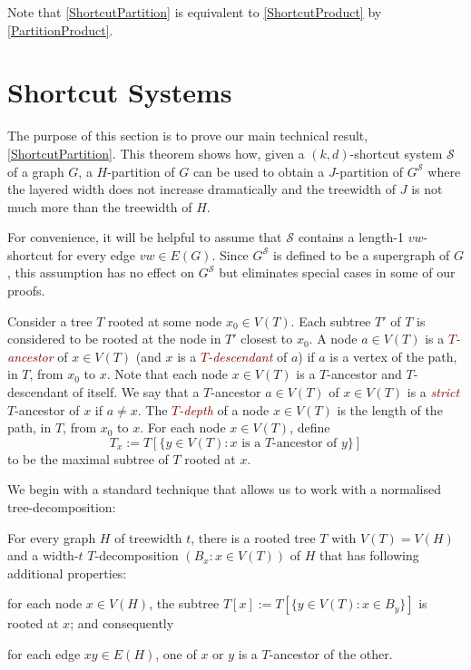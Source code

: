 \documentclass{patmorin}
\newcommand{\defin}[1]{\textcolor{Maroon}{\emph{#1}}}
\newcommand{\tlabel}[1]{\label{t:#1}}
\renewcommand{\SS}{\mathcal{S}}
\renewcommand{\le}{\leqslant}
\begin{document}
Note that \cref{ShortcutPartition} is equivalent to \cref{ShortcutProduct} by \cref{PartitionProduct}.



\section{Shortcut Systems}
\label{Structure}

The purpose of this section is to prove our main technical result, \cref{ShortcutPartition}. This theorem shows how, given a $(k,d)$-shortcut system $\SS$ of a graph $G$, a $H$-partition of $G$ can be used to obtain a $J$-partition of $G^{\SS}$ where the layered width  does not increase dramatically and the treewidth of $J$ is not much more than the treewidth of $H$.

For convenience, it will be helpful to assume that $\SS$ contains a length-1 $vw$-shortcut for every edge $vw\in E(G)$.  Since $G^\SS$ is defined to be a supergraph of $G$, this assumption has no effect on $G^{\SS}$ but eliminates special cases in some of our proofs.

Consider a tree $T$ rooted at some node $x_0\in V(T)$. Each subtree $T'$ of $T$ is considered to be rooted at the node in $T'$ closest to $x_0$. A node $a\in V(T)$ is a \defin{$T$-ancestor} of $x\in V(T)$ (and $x$ is a \defin{$T$-descendant} of $a$) if $a$ is a vertex of the path, in $T$, from $x_0$ to $x$.  Note that each node $x\in V(T)$ is a $T$-ancestor and $T$-descendant of itself.  We say that a $T$-ancestor $a\in V(T)$ of $x\in V(T)$ is a \defin{strict} $T$-ancestor of $x$ if $a\neq x$.
The \defin{$T$-depth} of a node $x\in V(T)$ is the length of the path, in $T$, from $x_0$ to $x$.  For each node $x\in V(T)$, define
\[T_x := T[\{y\in V(T):\mbox{$x$ is a $T$-ancestor of $y$}\}] \]
to be the maximal subtree of $T$ rooted at $x$.

We begin with a standard technique that allows us to work with a normalised tree-decomposition:

\begin{lem}
  For every graph $H$ of treewidth $t$, there is a rooted tree $T$ with $V(T)=V(H)$ and a width-$t$ $T$-decomposition $(B_x:x\in V(T))$ of $H$ that has following additional properties:
  \begin{compactenum}[(T1)]
    \item\tlabel{subtree-root} for each node $x\in V(H)$, the subtree $T[x]:=T[\{y\in V(T):x\in B_y\}]$ is rooted at $x$; and consequently
    \item\tlabel{ancestor-edge}\tlabel{last} for each edge $xy\in E(H)$, one of $x$ or $y$ is a $T$-ancestor of the other.
  \end{compactenum}
\end{lem}
\end{document}
